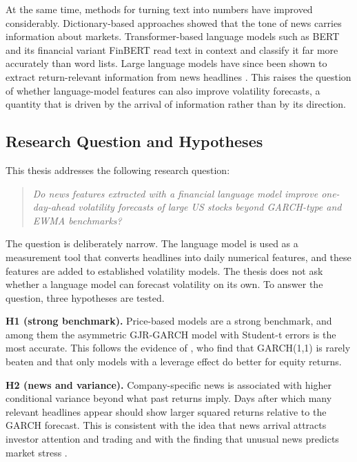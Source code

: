 \documentclass[12pt,a4paper]{article}
\begin{document}
At the same time, methods for turning text into numbers have improved considerably. Dictionary-based approaches \parencite{tetlock2007,loughran2011} showed that the tone of news carries information about markets. Transformer-based language models such as BERT \parencite{devlin2019} and its financial variant FinBERT \parencite{araci2019} read text in context and classify it far more accurately than word lists. Large language models have since been shown to extract return-relevant information from news headlines \parencite{lopezlira2023}. This raises the question of whether language-model features can also improve volatility forecasts, a quantity that is driven by the arrival of information rather than by its direction.

\subsection{Research Question and Hypotheses}\label{sec:rq}
This thesis addresses the following research question:

\begin{quote}
\emph{Do news features extracted with a financial language model improve one-day-ahead volatility forecasts of large US stocks beyond GARCH-type and EWMA benchmarks?}
\end{quote}

The question is deliberately narrow. The language model is used as a measurement tool that converts headlines into daily numerical features, and these features are added to established volatility models. The thesis does not ask whether a language model can forecast volatility on its own. To answer the question, three hypotheses are tested.

\textbf{H1 (strong benchmark).} Price-based models are a strong benchmark, and among them the asymmetric GJR-GARCH model with Student-t errors is the most accurate. This follows the evidence of \textcite{hansen2005}, who find that GARCH(1,1) is rarely beaten and that only models with a leverage effect do better for equity returns.

\textbf{H2 (news and variance).} Company-specific news is associated with higher conditional variance beyond what past returns imply. Days after which many relevant headlines appear should show larger squared returns relative to the GARCH forecast. This is consistent with the idea that news arrival attracts investor attention and trading \parencite{barber2008} and with the finding that unusual news predicts market stress \parencite{glasserman2019}.
\end{document}
